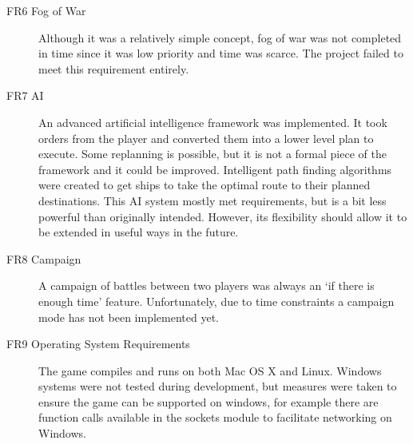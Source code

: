 \begin{description}
  \item[FR6 Fog of War] Although it was a relatively simple concept, fog of war was not completed in time since it was low priority and time was scarce. The project failed to meet this requirement entirely.

  \item[FR7 AI] An advanced artificial intelligence framework was implemented. It took orders from the player and converted them into a lower level plan to execute. Some replanning is possible, but it is not a formal piece of the framework and it could be improved. Intelligent path finding algorithms were created to get ships to take the optimal route to their planned destinations. This AI system mostly met requirements, but is a bit less powerful than originally intended. However, its flexibility should allow it to be extended in useful ways in the future.

  \item[FR8 Campaign] A campaign of battles between two players was always an `if there is enough time' feature. Unfortunately, due to time constraints a campaign mode has not been implemented yet.

  \item[FR9 Operating System Requirements] The game compiles and runs on both Mac OS X and Linux. Windows systems were not tested during development, but measures were taken to ensure the game can be supported on windows, for example there are function calls available in the sockets module to facilitate networking on Windows.

\end{description}

